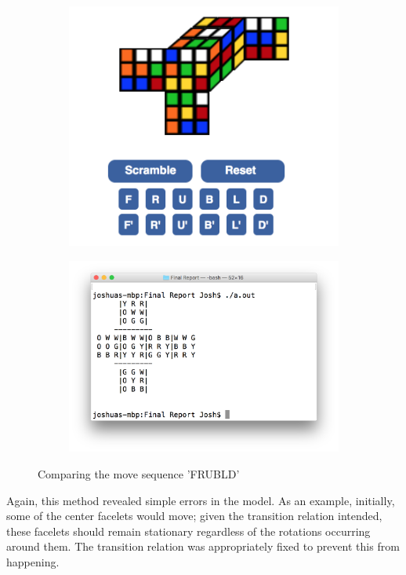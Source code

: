 \documentclass{article}
\begin{document}
\begin{figure}[h]
\begin{subfigure}{.5\textwidth}
\includegraphics[width=\textwidth]{pics/3x3x3OnlineSim_Verification.png}
\end{subfigure}
\begin{subfigure}{.5\textwidth}
\includegraphics[width=\textwidth]{pics/3x3x3Sim_Verification.png}
\end{subfigure}
\caption{Comparing the move sequence 'FRUBLD'}
\end{figure}

\noindent Again, this method revealed simple errors in the model. As an example, initially, some of the center facelets would move; given the transition relation intended, these facelets should remain stationary regardless of the rotations occurring around them. The transition relation was appropriately fixed to prevent this from happening. \\
\end{document}
